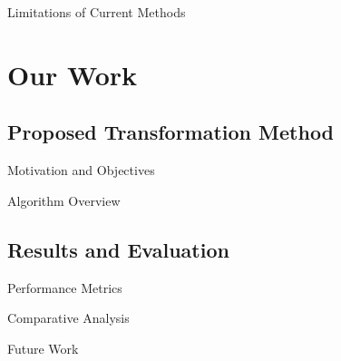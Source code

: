 \documentclass{beamer}
\begin{document}
\begin{frame}{Limitations of Current Methods}
\end{frame}

\section{Our Work}

\subsection{Proposed Transformation Method}

\begin{frame}{Motivation and Objectives}
\end{frame}

\begin{frame}{Algorithm Overview}
\end{frame}

\subsection{Results and Evaluation}

\begin{frame}{Performance Metrics}
\end{frame}

\begin{frame}{Comparative Analysis}
\end{frame}

\begin{frame}{Future Work}
\end{frame}

\end{document}
